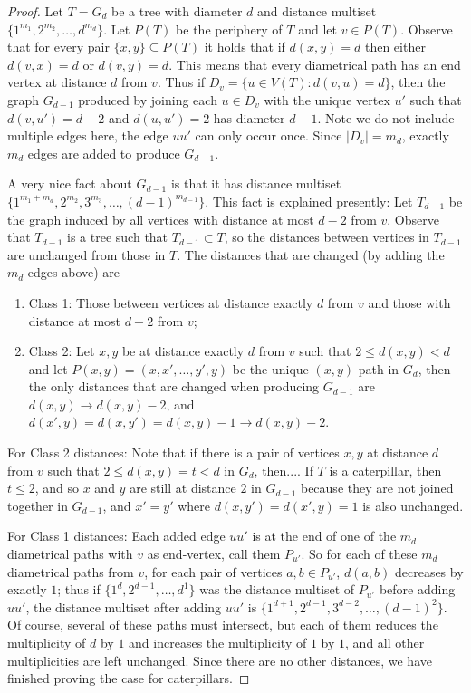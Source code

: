 \documentclass[12]{article}
\theoremstyle{definition}
\begin{document}
	\begin{proof}
		Let $T = G_d$ be a tree with diameter $d$ and distance multiset $\{1^{m_1}, 2^{m_2}, \ldots, d^{m_d}\}$.  Let $P(T)$ be the periphery of $T$ and let $v \in P(T)$.  Observe that for every pair $\{x, y\} \subseteq P(T)$ it holds that if $d(x,y) = d$ then either $d(v,x) = d$ or $d(v,y) = d$.  This means that every diametrical path has an end vertex at distance $d$ from $v$.  Thus if $D_v = \{u \in V(T): d(v,u) = d\}$, then the graph $G_{d-1}$ produced by joining each $u \in D_v$ with the unique vertex $u'$ such that $d(v,u') = d-2$ and $d(u,u') = 2$ has diameter $d-1$.  Note we do not include multiple edges here, the edge $uu'$ can only occur once.  Since $|D_v| = m_d$, exactly $m_d$ edges are added to produce $G_{d-1}$.
		
		A very nice fact about $G_{d-1}$ is that it has distance multiset $\{1^{m_1 + m_d}, 2^{m_2}, 3^{m_3}, \ldots, (d-1)^{m_{d-1}}\}$.  This fact is explained presently: Let $T_{d-1}$ be the graph induced by all vertices with distance at most $d-2$ from $v$.  Observe that $T_{d-1}$ is a tree such that $T_{d-1} \subset T$, so the distances between vertices in $T_{d-1}$ are unchanged from those in $T$.  The distances that are changed (by adding the $m_d$ edges above) are 
		\begin{enumerate}
			\item Class 1: Those between vertices at distance exactly $d$ from $v$ and those with distance at most $d-2$ from $v$;
			\item Class 2: Let $x,y$ be at distance exactly $d$ from $v$ such that $2 \leq d(x,y) < d$ and let $P(x,y) = (x,x',\ldots, y',y)$ be the unique $(x,y)$-path in $G_d$, then the only distances that are changed when producing $G_{d-1}$ are $d(x,y) \rightarrow d(x,y) -2$, and $d(x',y) = d(x,y') = d(x,y) - 1 \rightarrow d(x,y) - 2$.
		\end{enumerate}
		  For Class 2 distances: Note that if there is a pair of vertices $x,y$ at distance $d$ from $v$ such that $2 \leq d(x,y) = t < d$ in $G_d$, then....  If $T$ is a caterpillar, then $t \leq 2$, and so $x$ and $y$ are still at distance $2$ in $G_{d-1}$ because they are not joined together in $G_{d-1}$, and $x' = y'$ where $d(x,y') = d(x',y) = 1$ is also unchanged.  
		  
		  For Class 1 distances: Each added edge $uu'$ is at the end of one of the $m_d$ diametrical paths with $v$ as end-vertex, call them $P_{u'}$.  So for each of these $m_d$ diametrical paths from $v$, for each pair of vertices $a,b \in P_{u'}$, $d(a,b)$ decreases by exactly $1$; thus if $\{1^{d}, 2^{d-1}, \ldots, d^{1}\}$ was the distance multiset of $P_{u'}$ before adding $uu'$, the distance multiset after adding $uu'$ is $\{1^{d+1}, 2^{d-1}, 3^{d-2}, \ldots, (d-1)^{2}\}$.  Of course, several of these paths must intersect, but each of them reduces the multiplicity of $d$ by $1$ and increases the multiplicity of $1$ by $1$, and all other multiplicities are left unchanged.  Since there are no other distances, we have finished proving the case for caterpillars.
		  

\end{proof}
\end{document}
